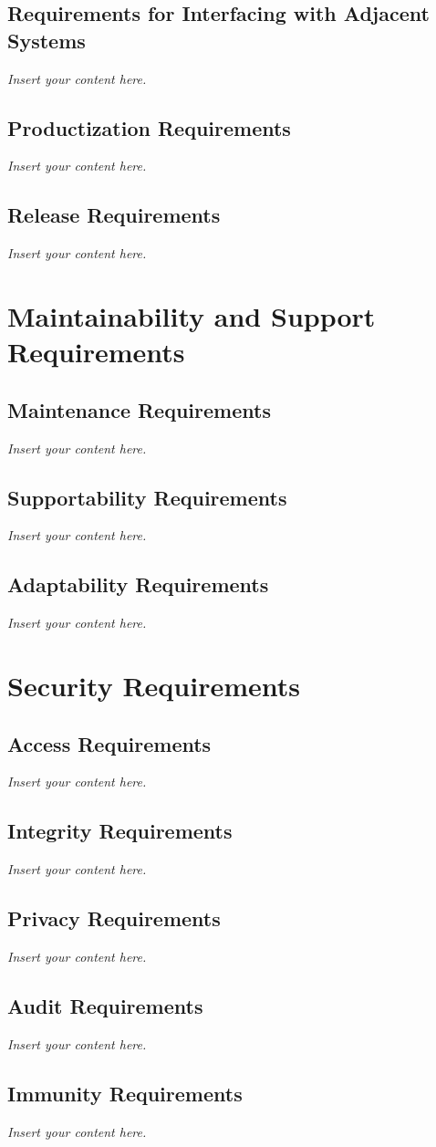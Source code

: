 \documentclass[12pt]{article}
\newcommand{\lips}{\textit{Insert your content here.}}
\begin{document}
\subsection{Requirements for Interfacing with Adjacent Systems}
\lips
\subsection{Productization Requirements}
\lips
\subsection{Release Requirements}
\lips

\section{Maintainability and Support Requirements}
\subsection{Maintenance Requirements}
\lips
\subsection{Supportability Requirements}
\lips
\subsection{Adaptability Requirements}
\lips

\section{Security Requirements}
\subsection{Access Requirements}
\lips
\subsection{Integrity Requirements}
\lips
\subsection{Privacy Requirements}
\lips
\subsection{Audit Requirements}
\lips
\subsection{Immunity Requirements}
\lips
\end{document}
